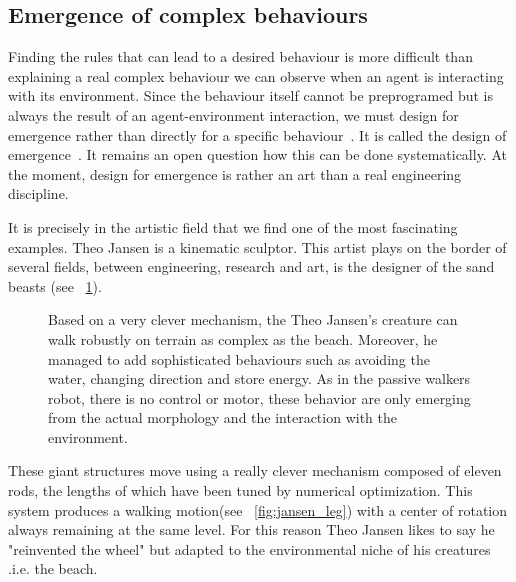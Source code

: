 \subsection{Emergence of complex behaviours} %

Finding the rules that can lead to a desired behaviour is more difficult than explaining a real complex behaviour we can observe when an agent is interacting with its environment. Since the behaviour itself cannot be preprogramed but is always the result of an agent-environment interaction, we must design for emergence rather than directly for a specific behaviour~\parencite{Pfeifer06}. It is called the design of emergence~\parencite{Steels1991emergence}. It remains an open question how this can be done systematically. At the moment, design for emergence is rather an art than a real engineering discipline.

It is precisely in the artistic field that we find one of the most fascinating examples. Theo Jansen is a kinematic sculptor. This artist plays on the border of several fields, between engineering, research and art, is the designer of the sand beasts (see \figurename~\ref{fig:theo_jansen_beast}).

\begin{figure}[tb]
\centering
    \newline
    \hfil
    \hfil
    \caption{Based on a very clever mechanism, the Theo Jansen's creature can walk robustly on terrain as complex as the beach. Moreover, he managed to add sophisticated behaviours such as avoiding the water, changing direction and store energy. As in the passive walkers robot, there is no control or motor, these behavior are only emerging from the actual morphology and the interaction with the environment.}
    \label{fig:theo_jansen_beast}
\end{figure}


These giant structures move using a really clever mechanism composed of eleven rods, the lengths of which have been tuned by numerical optimization. This system produces a walking motion(see \figurename~\ref{fig:jansen_leg}) with a center of rotation always remaining at the same level. For this reason Theo Jansen likes to say he "reinvented the wheel" but adapted to the environmental niche of his creatures .i.e. the beach.

